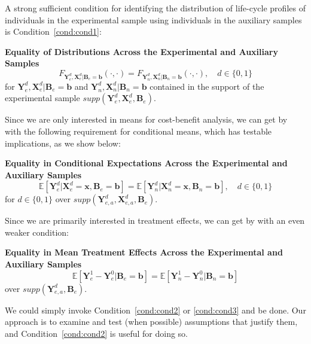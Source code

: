 A strong sufficient condition for identifying the distribution of life-cycle profiles of individuals in the experimental sample using individuals in the auxiliary samples is Condition~\ref{cond:cond1}:

\onehalfspacing
\begin{condition} \textbf{Equality of Distributions Across the Experimental and Auxiliary Samples \label{cond:cond1}}
\begin{equation}
F_{\bm{Y}_e^d, \bm{X}_e^d | \bm{B}_e = \bm{b}} \left( \cdot, \cdot \right) = F_{\bm{Y}_n^d, \bm{X}_n^d | \bm{B}_n = \bm{b}} \left( \cdot, \cdot \right), \quad d \in \{0,1\}
\end{equation}
\noindent for $\bm{Y}_e^d, \bm{X}^d_e | \bm{B}_e = \bm{b}$ and $\bm{Y}_n^d, \bm{X}^d_n | \bm{B}_n = \bm{b}$ contained in the support of the experimental sample $supp\left(\bm{Y}^d_{e}, \bm{X}^d_{e}, \bm{B}_{e} \right)$.
\end{condition}
\doublespacing

Since we are only interested in means for cost-benefit analysis, we can get by with the following requirement for conditional means, which has testable implications, as we show below:

\onehalfspacing
\begin{condition} \textbf{Equality in Conditional Expectations Across the Experimental and Auxiliary Samples \label{cond:cond2}}
\begin{equation}
\mathbb{E} \left[ \bm{Y}_e^d |  \bm{X}_e^d = \bm{x}, \bm{B}_e = \bm{b} \right] = \mathbb{E} \left[ \bm{Y}_n^d |  \bm{X}_n^d = \bm{x}, \bm{B}_n = \bm{b} \right], \quad d \in \{0,1\}
\end{equation}
for $d \in \{0, 1 \}$ over $supp\left(\bm{Y}^d_{e,a}, \bm{X}^d_{e,a}, \bm{B}_e\right)$.
\end{condition}
\doublespacing

Since we are primarily interested in treatment effects, we can get by with an even weaker condition:

\onehalfspacing
\begin{condition} \textbf{Equality in Mean Treatment Effects Across the Experimental and Auxiliary Samples \label{cond:cond3}}
\begin{equation}
\mathbb{E} \left[ \bm{Y}_e^1 - \bm{Y}_e^0 | \bm{B}_e = \bm{b} \right] = \mathbb{E} \left[ \bm{Y}_n^1 - \bm{Y}_n^0 | \bm{B}_n = \bm{b} \right]
\end{equation}
over $supp\left(\bm{Y}^d_{e,a}, \bm{B}_e\right)$.
\end{condition}
\doublespacing
We could simply invoke Condition~\ref{cond:cond2} or \ref{cond:cond3} and be done. Our approach is to examine and test (when possible) assumptions that justify them, and Condition~\ref{cond:cond2} is useful for doing so.

